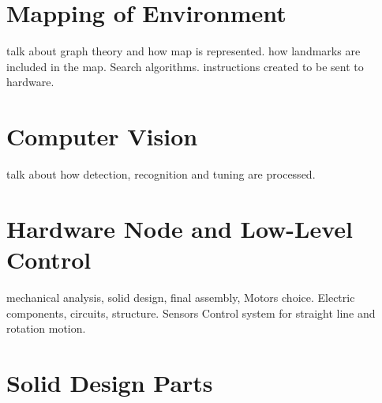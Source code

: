 \documentclass[12pt]{article}
\begin{document}
\section{Mapping of Environment}
talk about graph theory and how map is represented. how landmarks are included in the map. Search algorithms. instructions created to be sent to hardware.

\section{Computer Vision}
talk about how detection, recognition and tuning are processed.

\section{Hardware Node and Low-Level Control}
mechanical analysis, solid design, final assembly, Motors choice.
Electric components, circuits, structure.
Sensors
Control system for straight line and rotation motion.

\newpage
\appendix

\section{Solid Design Parts}


\newpage
 


\end{document}
